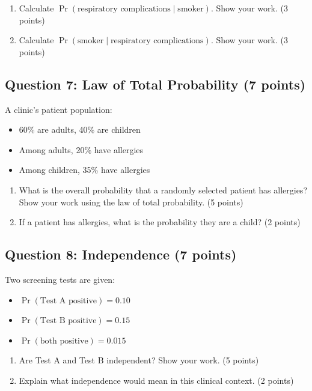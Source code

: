 \documentclass[11pt]{article}
\begin{document}
\begin{enumerate}[label=\alph*)]
\item Calculate $\Pr(\text{respiratory complications} \mid \text{smoker})$. Show your work. (3 points)
\item Calculate $\Pr(\text{smoker} \mid \text{respiratory complications})$. Show your work. (3 points)
\end{enumerate}

\vspace{1.5cm}

\subsection*{Question 7: Law of Total Probability (7 points)}

A clinic's patient population:
\begin{itemize}
\item 60\% are adults, 40\% are children
\item Among adults, 20\% have allergies
\item Among children, 35\% have allergies
\end{itemize}

\begin{enumerate}[label=\alph*)]
\item What is the overall probability that a randomly selected patient has allergies? Show your work using the law of total probability. (5 points)
\item If a patient has allergies, what is the probability they are a child? (2 points)
\end{enumerate}

\vspace{1.5cm}

\subsection*{Question 8: Independence (7 points)}

Two screening tests are given:
\begin{itemize}
\item $\Pr(\text{Test A positive}) = 0.10$
\item $\Pr(\text{Test B positive}) = 0.15$
\item $\Pr(\text{both positive}) = 0.015$
\end{itemize}

\begin{enumerate}[label=\alph*)]
\item Are Test A and Test B independent? Show your work. (5 points)
\item Explain what independence would mean in this clinical context. (2 points)
\end{enumerate}
\end{document}
